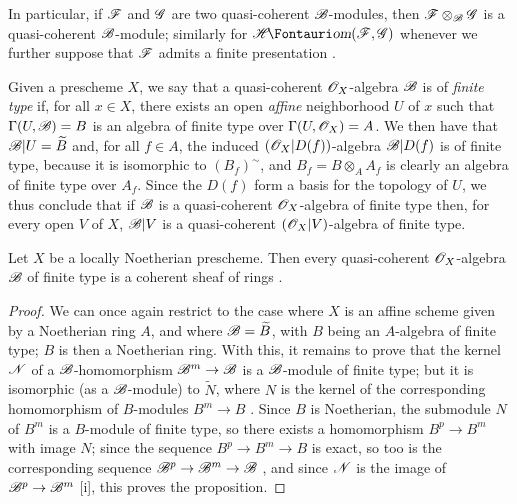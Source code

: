 In particular, if $\mathscr{F}$ and $\mathscr{G}$ are two quasi-coherent $\mathscr{B}$-modules, then $\mathscr{F}\otimes_{\mathscr{B}}\mathscr{G}$ is a quasi-coherent $\mathscr{B}$-module; similarly for $\shHom(\sh{F},\sh{G})$ whenever we further suppose that $\mathscr{F}$ admits a finite presentation .

\begin{env}[9.6.2]
\label{I.9.6.2}
Given a prescheme $X$, we say that a quasi-coherent $\mathscr{O}_X$-algebra $\mathscr{B}$ is of \emph{finite type} if, for all $x\in X$, there exists an open \emph{affine} neighborhood $U$ of $x$ such that $\Gamma(U,\mathscr{B})=B$ is an algebra of finite type over $\Gamma(U,\mathscr{O}_X)=A$.
We then have that $\mathscr{B}|U=\widetilde{B}$ and, for all $f\in A$, the induced $(\mathscr{O}_X|D(f))$-algebra $\mathscr{B}|D(f)$ is of finite type, because it is isomorphic to $(B_f)^{\sim}$, and $B_f=B\otimes_A A_f$ is clearly an algebra of finite type over $A_f$.
Since the $D(f)$ form a basis for the topology of $U$, we thus conclude that if $\mathscr{B}$ is a quasi-coherent $\mathscr{O}_X$-algebra of finite type then, for every open $V$ of $X$, $\mathscr{B}|V$ is a quasi-coherent $(\mathscr{O}_X|V)$-algebra of finite type.
\end{env}

\begin{proposition}[9.6.3]
\label{I.9.6.3}
Let $X$ be a locally Noetherian prescheme.
Then every quasi-coherent $\mathscr{O}_X$-algebra $\mathscr{B}$ of finite type is a coherent sheaf of rings .
\end{proposition}

\begin{proof}
We can once again restrict to the case where $X$ is an affine scheme given by a Noetherian ring $A$, and where $\mathscr{B}=\widetilde{B}$, with $B$ being an $A$-algebra of finite type; $B$ is then a Noetherian ring.
With this, it remains to prove that the kernel $\mathscr{N}$ of a $\mathscr{B}$-homomorphism $\sh{B}^m\to\sh{B}$ is a $\mathscr{B}$-module
of finite type; but it is isomorphic (as a $\mathscr{B}$-module) to $\widetilde{N}$, where $N$ is the kernel of the corresponding homomorphism of $B$-modules $B^m\to B$ .
Since $B$ is Noetherian, the submodule $N$ of $B^m$ is a $B$-module of finite type, so there exists a homomorphism $B^p\to B^m$ with image $N$; since the sequence $B^p\to B^m\to B$ is exact, so too is the corresponding sequence $\sh{B}^p\to\sh{B}^m\to\sh{B}$ , and since $\mathscr{N}$ is the image of $\sh{B}^p\to\sh{B}^m$ [i], this proves the proposition.
\end{proof}

